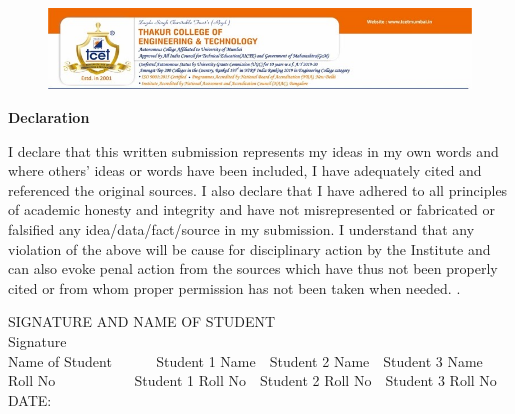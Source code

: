 \documentclass{book}
\begin{document}
\begin{figure}[h]
	\centering
	\includegraphics[scale=0.63]{tcet.jpg}
\end{figure}
\Huge
\textbf{Declaration\\} 
\begin{doublespace}
	\Large
	I declare that this written submission represents my ideas in my own words and where others' ideas or words have been included, I have adequately cited and referenced the original sources. I also declare that I have adhered to all principles of academic honesty and integrity and have not misrepresented or fabricated or falsified any idea/data/fact/source in my submission. I understand that any violation of the above will be cause for disciplinary action by the Institute and can also evoke penal action from the sources which have thus not been properly cited or from whom proper permission has not been taken when needed.
.%
\end{doublespace}
\tab\tab
\begin{doublespace}
	\normalsize
	\begin{flushleft}
		SIGNATURE AND NAME OF STUDENT\\
		
		Signature\\
		Name of Student \,\,\,\,\,\,\,\,\,\,\,\,\,\,\, Student 1 Name \,\, Student 2 Name \, \,Student 3 Name\\
		Roll No \,\,\,\,\,\,\,\,\,\,\,\,\,\,\,\,\,\,\,\,\,\,\,\,\,\,\,\,\,\, Student 1 Roll No \,\, Student 2 Roll No \, \,Student 3 Roll No\\
		\tab\tab\tab\tab
		DATE:
	\end{flushleft}
	
\end{doublespace}


\normalsize
	
	
	
\end{document}
